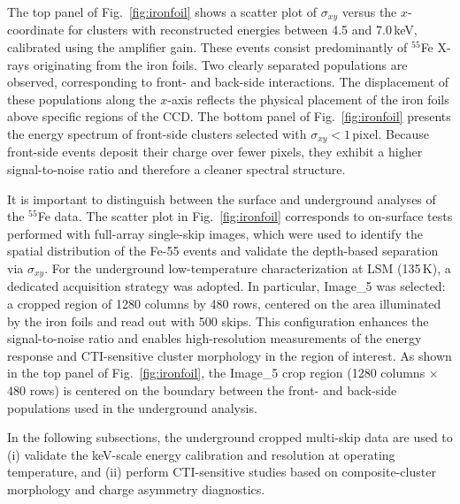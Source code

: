 \documentclass[11pt]{article}
\begin{document}
The top panel of Fig.~\ref{fig:ironfoil} shows a scatter plot of $\sigma_{xy}$ versus the $x$-coordinate for clusters with reconstructed energies between 4.5 and 7.0\,keV, calibrated using the amplifier gain. 
These events consist predominantly of $^{55}$Fe X-rays originating from the iron foils. 
Two clearly separated populations are observed, corresponding to front- and back-side interactions. 
The displacement of these populations along the $x$-axis reflects the physical placement of the iron foils above specific regions of the CCD. 
The bottom panel of Fig.~\ref{fig:ironfoil} presents the energy spectrum of front-side clusters selected with $\sigma_{xy}<1$\,pixel. 
Because front-side events deposit their charge over fewer pixels, they exhibit a higher signal-to-noise ratio and therefore a cleaner spectral structure.

It is important to distinguish between the surface and underground analyses of the $^{55}$Fe data. 
The scatter plot in Fig.~\ref{fig:ironfoil} corresponds to on-surface tests performed with full-array single-skip images, which were used to identify the spatial distribution of the Fe-55 events and validate the depth-based separation via $\sigma_{xy}$. 
For the underground low-temperature characterization at LSM (135\,K), a dedicated acquisition strategy was adopted. 
In particular, Image\_5 was selected: a cropped region of 1280 columns by 480 rows, centered on the area illuminated by the iron foils and read out with 500 skips.
This configuration enhances the signal-to-noise ratio and enables high-resolution measurements of the energy response and CTI-sensitive cluster morphology in the region of interest. As shown in the top panel of Fig.~\ref{fig:ironfoil}, the Image\_5 crop region (1280 columns $\times$ 480 rows) is centered on the boundary between the front- and back-side populations used in the underground analysis.

In the following subsections, the underground cropped multi-skip data are used to (i) validate the keV-scale energy calibration and resolution at operating temperature, and (ii) perform CTI-sensitive studies based on composite-cluster morphology and charge asymmetry diagnostics.
\end{document}

